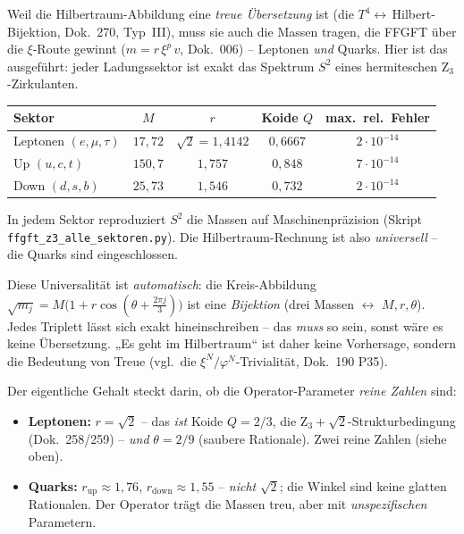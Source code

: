 Weil die Hilbertraum-Abbildung eine \emph{treue Übersetzung} ist (die
$T^4\!\leftrightarrow$\,Hilbert-Bijektion, Dok.~270, Typ~III), muss sie auch die
Massen tragen, die FFGFT über die $\xi$-Route gewinnt ($m=r\,\xi^p\,v$,
Dok.~006) -- Leptonen \emph{und} Quarks. Hier ist das ausgeführt: jeder
Ladungssektor ist exakt das Spektrum $S^2$ eines hermiteschen Z$_3$-Zirkulanten.

\begin{center}
\begin{tabular}{lcccc}
\toprule
Sektor & $M$ & $r$ & Koide $Q$ & max.\ rel.\ Fehler \\
\midrule
Leptonen $(e,\mu,\tau)$ & $17{,}72$ & $\sqrt2=1{,}4142$ & $0{,}6667$ & $2\cdot10^{-14}$ \\
Up $(u,c,t)$            & $150{,}7$ & $1{,}757$         & $0{,}848$  & $7\cdot10^{-14}$ \\
Down $(d,s,b)$          & $25{,}73$ & $1{,}546$         & $0{,}732$  & $2\cdot10^{-14}$ \\
\bottomrule
\end{tabular}
\end{center}

In jedem Sektor reproduziert $S^2$ die Massen auf Maschinenpräzision (Skript
\texttt{ffgft\_z3\_alle\_sektoren.py}). Die Hilbertraum-Rechnung ist also
\emph{universell} -- die Quarks sind eingeschlossen.

\begin{warningboxenv}
Diese Universalität ist \emph{automatisch}: die Kreis-Abbildung
$\sqrt{m_j}=M\bigl(1+r\cos(\theta+\tfrac{2\pi j}{3})\bigr)$ ist eine
\emph{Bijektion} (drei Massen $\leftrightarrow$ $M,r,\theta$). Jedes Triplett
lässt sich exakt hineinschreiben -- das \emph{muss} so sein, sonst wäre es keine
Übersetzung. „Es geht im Hilbertraum`` ist daher keine Vorhersage, sondern die
Bedeutung von Treue (vgl.\ die $\xi^N/\varphi^N$-Trivialität, Dok.~190 P35).
\end{warningboxenv}

Der eigentliche Gehalt steckt darin, ob die Operator-Parameter \emph{reine
Zahlen} sind:
\begin{itemize}
  \item \textbf{Leptonen:} $r=\sqrt2$ -- das \emph{ist} Koide $Q=2/3$, die
        Z$_3+\sqrt2$-Strukturbedingung (Dok.~258/259) -- \emph{und} $\theta=2/9$
        (saubere Rationale). Zwei reine Zahlen (siehe oben).
  \item \textbf{Quarks:} $r_{\text{up}}\approx1{,}76$,
        $r_{\text{down}}\approx1{,}55$ -- \emph{nicht} $\sqrt2$; die Winkel sind
        keine glatten Rationalen. Der Operator trägt die Massen treu, aber mit
        \emph{unspezifischen} Parametern.
\end{itemize}

